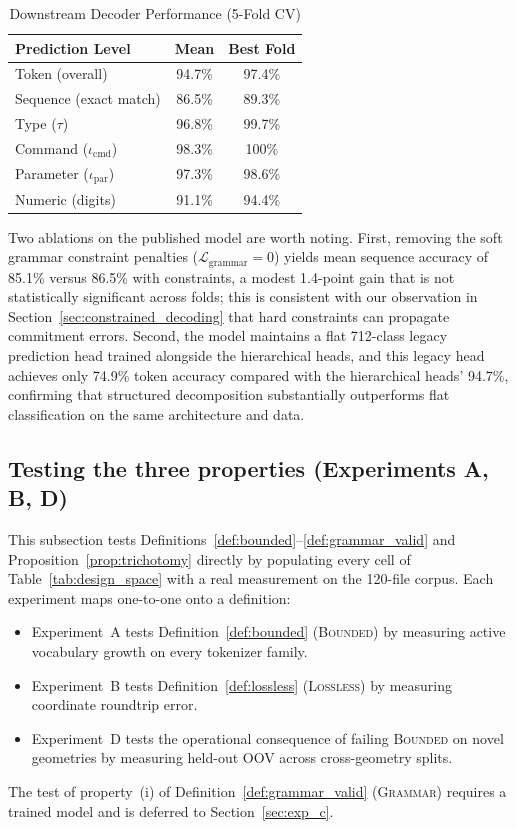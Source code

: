 \documentclass[11pt]{article}
\begin{document}
\begin{table}[htbp]
\centering
\caption{Downstream Decoder Performance (5-Fold CV)}
\label{tab:downstream}
\small
\begin{tabular}{@{}lcc@{}}
\toprule
\textbf{Prediction Level} & \textbf{Mean} & \textbf{Best Fold} \\
\midrule
Token (overall)              & 94.7\% & 97.4\% \\
Sequence (exact match)       & 86.5\% & 89.3\% \\
Type ($\tau$)                & 96.8\% & 99.7\% \\
Command ($\iota_{\text{cmd}}$) & 98.3\% & 100\% \\
Parameter ($\iota_{\text{par}}$) & 97.3\% & 98.6\% \\
Numeric (digits)             & 91.1\% & 94.4\% \\
\bottomrule
\end{tabular}
\normalsize
\end{table}

Two ablations on the published model are worth noting. First, removing the soft grammar constraint penalties ($\mathcal{L}_{\text{grammar}} = 0$) yields mean sequence accuracy of 85.1\% versus 86.5\% with constraints, a modest 1.4-point gain that is not statistically significant across folds; this is consistent with our observation in Section~\ref{sec:constrained_decoding} that hard constraints can propagate commitment errors. Second, the model maintains a flat 712-class legacy prediction head trained alongside the hierarchical heads, and this legacy head achieves only 74.9\% token accuracy compared with the hierarchical heads' 94.7\%, confirming that structured decomposition substantially outperforms flat classification on the same architecture and data.

\subsection{Testing the three properties (Experiments A, B, D)}
\label{sec:design_space_exp}

This subsection tests Definitions~\ref{def:bounded}--\ref{def:grammar_valid} and Proposition~\ref{prop:trichotomy} directly by populating every cell of Table~\ref{tab:design_space} with a real measurement on the 120-file corpus. Each experiment maps one-to-one onto a definition:
\begin{itemize}[leftmargin=*, nosep]
    \item Experiment~A tests Definition~\ref{def:bounded} (\textsc{Bounded}) by measuring active vocabulary growth on every tokenizer family.
    \item Experiment~B tests Definition~\ref{def:lossless} (\textsc{Lossless}) by measuring coordinate roundtrip error.
    \item Experiment~D tests the operational consequence of failing \textsc{Bounded} on novel geometries by measuring held-out OOV across cross-geometry splits.
\end{itemize}
The test of property~(i) of Definition~\ref{def:grammar_valid} (\textsc{Grammar}) requires a trained model and is deferred to Section~\ref{sec:exp_c}.
\end{document}
